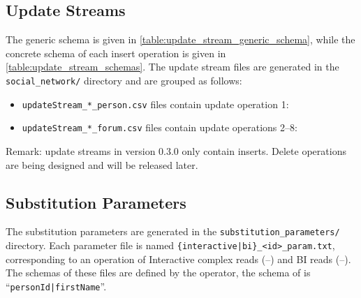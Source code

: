 \subsection{Update Streams}



The generic schema is given in \autoref{table:update_stream_generic_schema}, while the concrete schema of each insert operation is given in \autoref{table:update_stream_schemas}.
The update stream files are generated in the \texttt{social\_network/} directory and are grouped as follows:

\begin{itemize}
    \item \texttt{updateStream\_*\_person.csv} files contain update operation 1: 
    \item \texttt{updateStream\_*\_forum.csv} files contain update operations 2--8: %
\end{itemize}

Remark: update streams in version 0.3.0 only contain inserts. Delete operations are being designed and will be released later.

\subsection{Substitution Parameters}

The substitution parameters are generated in the \texttt{substitution\_parameters/} directory.
Each parameter file is named \texttt{\{interactive|bi\}\_<id>\_param.txt}, corresponding to an operation of
Interactive complex reads (--) and
BI reads (--).
The schemas of these files are defined by the operator, \eg the schema of  is ``\texttt{personId|firstName}''.


